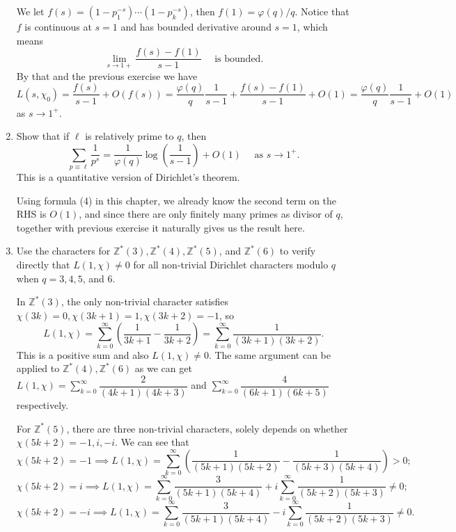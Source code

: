 \documentclass{article}
\begin{document}
\begin{enumerate}
    \begin{solution}
        We let $f(s) = (1-p_1^{-s})\cdots (1-p_k^{-s})$, then $f(1)=\varphi(q)/q$. Notice that $f$ is continuous at $s=1$ and has bounded
        derivative around $s=1$, which means
        $$\lim_{s\to 1+} \dfrac{f(s) - f(1)}{s-1}\quad\text{ is bounded.}$$
        By that and the previous exercise we have
        $$L(s, \chi_0) = \dfrac{f(s)}{s-1} + O(f(s))=\dfrac{\varphi(q)}q \dfrac{1}{s-1} + \dfrac{f(s)-f(1)}{s-1} + O(1)=
            \dfrac{\varphi(q)}q \dfrac{1}{s-1} + O(1)$$
        as $s\to 1^+$.
    \end{solution}
    \item Show that if $\ell$ is relatively prime to $q$, then
    $$\sum_{p\equiv \ell} \dfrac{1}{p^s} = \dfrac1{\varphi(q)}\log\left(\dfrac1{s-1}\right) + O(1) \quad\text{ as } s\to 1^+.$$
    This is a quantitative version of Dirichlet's theorem.

    \begin{solution}
        Using formula (4) in this chapter, we already know the second term on the RHS is $O(1)$, and since there are only finitely many primes as divisor of $q$, together
        with previous exercise it naturally gives us the result here.
    \end{solution}
    \item Use the characters for $\mathbb Z^*(3), \mathbb Z^*(4), \mathbb Z^*(5)$, and $\mathbb Z^*(6)$ to verify
    directly  that $L(1, \chi)\neq 0$ for all non-trivial Dirichlet characters modulo $q$ when
    $q=3,4,5$, and $6$.

    \begin{solution}
        In $\mathbb Z^*(3)$, the only non-trivial character satisfies $\chi(3k)=0, \chi(3k+1)=1, \chi(3k+2)=-1$, so 
        $$L(1, \chi) = \sum_{k=0}^\infty \left(\frac1{3k+1} - \frac1{3k+2}\right) = \sum_{k=0}^\infty \dfrac1{(3k+1)(3k+2)}.$$
        This is a positive sum and also $L(1, \chi) \neq 0$.
        The same argument can be applied to $\mathbb Z^*(4), \mathbb Z^*(6)$ as we can get $L(1, \chi) = \sum_{k=0}^\infty \dfrac2{(4k+1)(4k+3)}$
        and $\sum_{k=0}^\infty \dfrac4{(6k+1)(6k+5)}$ respectively.

        For $\mathbb Z^*(5)$, there are three non-trivial characters, solely depends on whether $\chi(5k+2)=-1, i, -i$.
        We can see that 
        $$\chi(5k+2)=-1 \implies L(1, \chi) = \sum_{k=0}^\infty \left(\dfrac1{(5k+1)(5k+2)} - \dfrac1{(5k+3)(5k+4)}\right) > 0;$$
        $$\chi(5k+2)=i \implies L(1, \chi) = \sum_{k=0}^\infty \dfrac3{(5k+1)(5k+4)} + i\sum_{k=0}^\infty \dfrac1{(5k+2)(5k+3)} \neq 0;$$
        $$\chi(5k+2)=-i \implies L(1, \chi) = \sum_{k=0}^\infty \dfrac3{(5k+1)(5k+4)} - i\sum_{k=0}^\infty \dfrac1{(5k+2)(5k+3)} \neq 0.$$
    \end{solution}


\end{enumerate}
\end{document}
